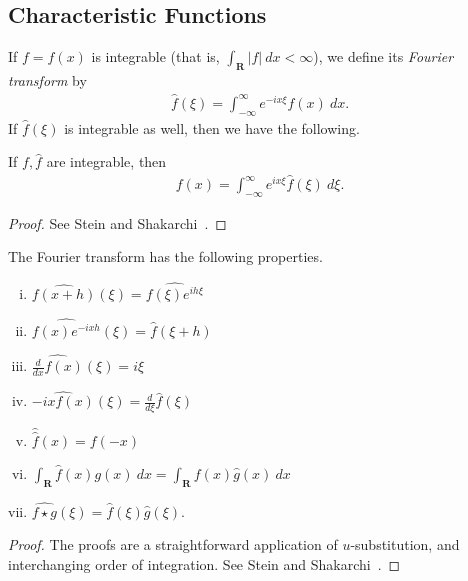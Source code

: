 \subsection{Characteristic Functions}
If $f = f(x)$ is integrable (that is, $\int_{\mathbf{R}}| f | \ dx < \infty$), we define its \emph{Fourier transform} by
\begin{equation*}
	\begin{split}
		\hat{f}(\xi) = \int_{-\infty}^{\infty} e^{-i x \xi} f(x) \ dx.
	\end{split}
\end{equation*}
If $ \hat{f}(\xi)$ is integrable as well, then we have the
following.
\begin{theorem}\label{thm:fourier-inversion}
	If $f, \hat{f}$ are integrable, then
	\begin{equation*}
		\begin{split}
			f(x) = \int_{-\infty}^{\infty} e^{i x \xi} \hat{f}(\xi) \ d \xi.
		\end{split}
	\end{equation*}
\end{theorem}
\begin{proof}
	See Stein and Shakarchi~\cite{zbMATH02171466}.
\end{proof}
\begin{proposition}\label{prop:fourier-props}
	The Fourier transform has the following properties.
	\begin{enumerate}[(i)]
		\item	$\widehat{f(x+h)}(\xi) = \widehat{f(\xi) e^{i h \xi}}$
		\item $\widehat{f(x) e^{-i x h}}(\xi) = \widehat{f}(\xi + h)$	
		\item $\widehat{\frac{d}{dx} f(x)}(\xi) = i \xi$
		\item $\widehat{-ix f(x)}(\xi) = \frac{d}{d \xi}\widehat{f}(\xi)$
		\item $\hat{\hat{f}}(x) = f(-x)$
		\item $\int_{\mathbf{R}} \widehat{f}(x) g(x) \ dx = \int_{\mathbf{R}} f(x) \widehat{g}(x) \ dx$
		\item $\widehat{f \star g}(\xi) = \widehat{f}(\xi) \widehat{g}(\xi)$.
	\end{enumerate}
\end{proposition}
\begin{proof}
	The proofs are a straightforward
	application of $u$-substitution, and interchanging order of integration.
	See Stein and Shakarchi~\cite{zbMATH02171466}. 
\end{proof}
